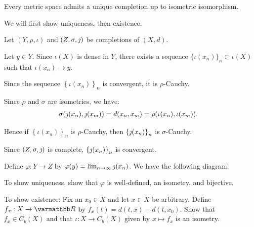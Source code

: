 \documentclass[10pt,oneside,openany]{memoir}
\begin{document}
\begin{theorem}
    Every metric space admits a unique completion up to isometric isomorphism.
\end{theorem}
    \begin{sproof}
        We will first show uniqueness, then existence. \nl
        
        \noindent Let $(Y,\rho,\iota)$ and $(Z,\sigma,\jmath)$ be completions of $(X,d)$. \nl
        
        \noindent Let $y \in Y$. Since $\iota(X)$ is dense in $Y$, there exists a sequence $\{\iota(x_n)\}_n \subset \iota(X)$ such that $\iota(x_n) \rightarrow y$. \nl
        
        \noindent Since the sequence $\left\{ \iota(x_n) \right\}_n$ is convergent, it is $\rho$-Cauchy. \nl
        
        \noindent Since $\rho$ and $\sigma$ are isometries, we have:
            \begin{equation*}
            \begin{split}
                \sigma(\jmath(x_n),\jmath(x_m)) = d(x_n,x_m) = \rho(\iota(x_n),\iota(x_m)).
            \end{split}
            \end{equation*}
            
        \noindent Hence if $\left\{ \iota(x_n) \right\}_n$ is $\rho$-Cauchy, then $\left\{ \jmath(x_n) \right\}_n$ is $\sigma$-Cauchy. \nl
        
        \noindent Since $(Z,\sigma,\jmath)$ is complete, $\left\{ \jmath(x_n) \right\}_n$ is convergent. \nl
        
        \noindent Define $\varphi:Y \rightarrow Z$ by $\varphi(y) = \lim_{n \rightarrow \infty} \jmath(x_n)$. We have the following diagram:
            \begin{center}
            \end{center}
        \noindent To show uniqueness, show that $\varphi$ is well-defined, an isometry, and bijective. \nl
        
        \noindent To show existence: Fix an $x_0 \in X$ and let $x \in X$ be arbitrary. Define $f_x:X \rightarrow \bfR$ by $f_x(t) = d(t,x) - d(t,x_0)$. Show that $f_x \in C_b(X)$ and that $\iota:X \rightarrow C_b(X)$ given by $x \mapsto f_x$ is an isometry.
    \end{sproof}
\end{document}
